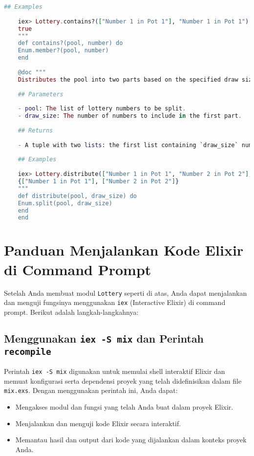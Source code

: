 \begin{lstlisting}[language=elixir, caption={Complete Lottery Module}]
	## Examples
	
	iex> Lottery.contains?(["Number 1 in Pot 1"], "Number 1 in Pot 1")
	true
	"""
	def contains?(pool, number) do
	Enum.member?(pool, number)
	end
	
	@doc """
	Distributes the pool into two parts based on the specified draw size.
	
	## Parameters
	
	- pool: The list of lottery numbers to be split.
	- draw_size: The number of numbers to include in the first part.
	
	## Returns
	
	- A tuple with two lists: the first list containing `draw_size` numbers, and the second list containing the remaining numbers.
	
	## Examples
	
	iex> Lottery.distribute(["Number 1 in Pot 1", "Number 2 in Pot 2"], 1)
	{["Number 1 in Pot 1"], ["Number 2 in Pot 2"]}
	"""
	def distribute(pool, draw_size) do
	Enum.split(pool, draw_size)
	end
	end
\end{lstlisting}

\section{Panduan Menjalankan Kode Elixir di Command Prompt}

Setelah Anda membuat modul \texttt{Lottery} seperti di atas, Anda dapat menjalankan dan menguji fungsinya menggunakan \texttt{iex} (Interactive Elixir) di command prompt. Berikut adalah langkah-langkahnya:

\subsection{Menggunakan \texttt{iex -S mix} dan Perintah \texttt{recompile}}

Perintah \texttt{iex -S mix} digunakan untuk memulai shell interaktif Elixir dan memuat konfigurasi serta dependensi proyek yang telah didefinisikan dalam file \texttt{mix.exs}. Dengan menggunakan perintah ini, Anda dapat:

\begin{itemize}
	\item Mengakses modul dan fungsi yang telah Anda buat dalam proyek Elixir.
	\item Menjalankan dan menguji kode Elixir secara interaktif.
	\item Memantau hasil dan output dari kode yang dijalankan dalam konteks proyek Anda.
\end{itemize}

